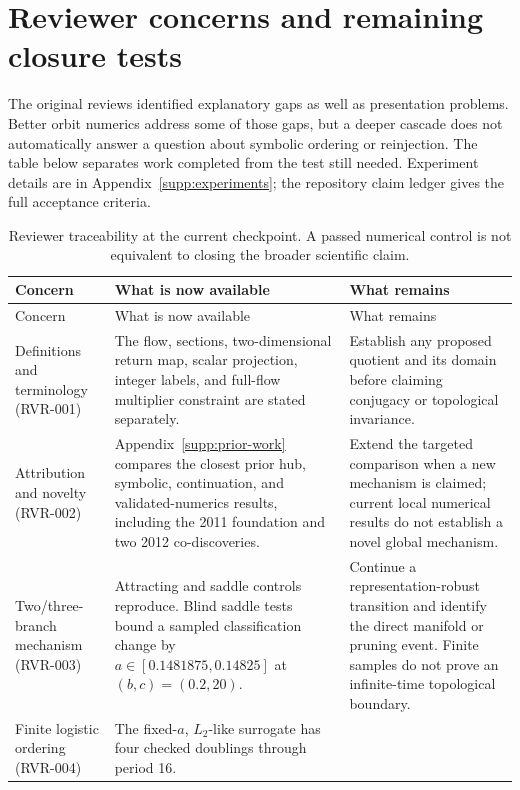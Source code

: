 \section{Reviewer concerns and remaining closure tests}
\label{supp:reviewers}

The original reviews identified explanatory gaps as well as presentation
problems. Better orbit numerics address some of those gaps, but a deeper
cascade does not automatically answer a question about symbolic ordering or
reinjection. The table below separates work completed from the test still
needed. Experiment details are in Appendix~\ref{supp:experiments}; the
repository claim ledger gives the full acceptance criteria.

\small
\renewcommand{\arraystretch}{1.15}
\begin{longtable}{@{}P{0.22\textwidth}P{0.34\textwidth}P{0.35\textwidth}@{}}
\caption{Reviewer traceability at the current checkpoint. A passed numerical
control is not equivalent to closing the broader scientific claim.}
\label{tab:reviewer-closure}\\
\toprule
Concern & What is now available & What remains \\
\midrule
\endfirsthead
\toprule
Concern & What is now available & What remains \\
\midrule
\endhead
\bottomrule
\endfoot
Definitions and terminology (RVR-001) &
The flow, sections, two-dimensional return map, scalar projection, integer
labels, and full-flow multiplier constraint are stated separately. &
Establish any proposed quotient and its domain before claiming
conjugacy or topological invariance. \\[0.5em]
Attribution and novelty (RVR-002) &
Appendix~\ref{supp:prior-work} compares the closest prior hub, symbolic,
continuation, and validated-numerics results, including the 2011 foundation
and two 2012 co-discoveries. &
Extend the targeted comparison when a new mechanism is claimed; current
local numerical results do not establish a novel global mechanism. \\[0.5em]
Two/three-branch mechanism (RVR-003) &
Attracting and saddle controls reproduce. Blind saddle tests bound a sampled
classification change by $a\in[0.1481875,0.14825]$ at $(b,c)=(0.2,20)$. &
Continue a representation-robust transition and identify the direct
manifold or pruning event. Finite samples do not prove an infinite-time
topological boundary. \\[0.5em]
Finite logistic ordering (RVR-004) &
The fixed-$a$, $L_2$-like surrogate has four checked doublings through period 16.

\end{longtable}

